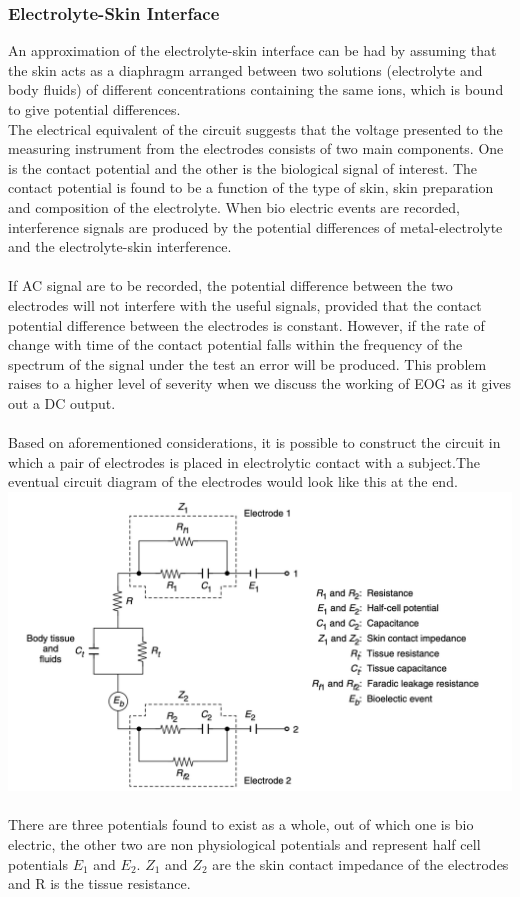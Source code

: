 \documentclass{article}
\begin{document}
\subsubsection{Electrolyte-Skin Interface}
An approximation of the electrolyte-skin interface can be had by assuming that the skin acts as a diaphragm arranged between two solutions (electrolyte and body fluids) of different concentrations containing the same ions, which is bound to give potential differences.\\The electrical equivalent of the circuit suggests that the voltage presented to the measuring instrument from the electrodes consists of two main components. One is the contact potential and the other is the biological signal of interest. The contact potential is found to be a function of the type of skin, skin preparation and composition of the electrolyte. When bio electric events are recorded, interference signals are produced by the potential differences of metal-electrolyte and the electrolyte-skin interference. \\
\\
If AC signal are to be recorded, the potential difference between the two electrodes will not interfere with the useful signals, provided that the contact potential difference between the electrodes is constant. However, if the rate of change with time of the contact potential falls within the frequency of the spectrum of the signal under the test an error will be produced. This problem raises to a higher level of severity when we discuss the working of EOG as it gives out a DC output.\\
\\
Based on aforementioned considerations, it is possible to construct the circuit in which a pair of electrodes is placed in electrolytic contact with a subject.The eventual circuit diagram of the electrodes would look like this at the end.\\
\includegraphics[scale=0.5]{Screenshot 2023-05-01 at 1.07.23 AM.png}
\\
\\There are three potentials found to exist as a whole, out of which one is bio electric, the other two are non physiological potentials and represent half cell potentials $E_1$ and $E_2$. $Z_1$ and $Z_2$ are the skin contact impedance of the electrodes and R is the tissue resistance.
\end{document}
